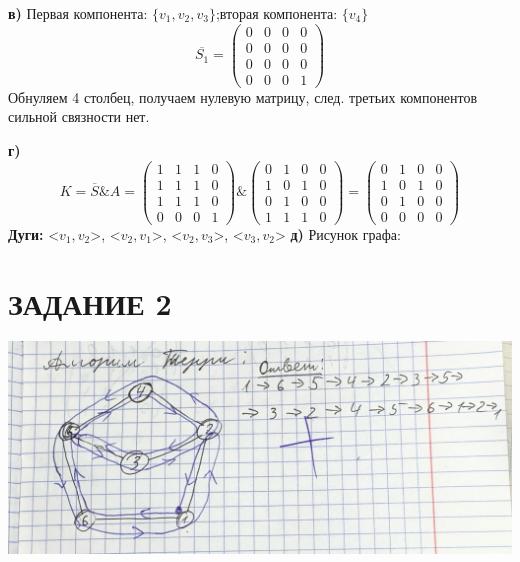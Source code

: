 \documentclass[14pt]{extarticle}
\begin{document}
\textbf{в)} Первая компонента: \(\{v_1,v_2,v_3\}\);вторая компонента: \(\{v_4\}\)
\[
\overline{S_1} = \begin{pmatrix}
0 & 0 & 0 & 0 \\
0 & 0 & 0 & 0 \\
0 & 0 & 0 & 0 \\
0 & 0 & 0 & 1
\end{pmatrix}
\]
Обнуляем 4 столбец, получаем нулевую матрицу, след. третьих компонентов сильной связности нет.

\textbf{г)} \[ K = \overline{S} \& A = 
\begin{pmatrix}
1 & 1 & 1 & 0 \\
1 & 1 & 1 & 0 \\
1 & 1 & 1 & 0 \\
0 & 0 & 0 & 1
\end{pmatrix}
\&
\begin{pmatrix}
0 & 1 & 0 & 0 \\
1 & 0 & 1 & 0 \\
0 & 1 & 0 & 0 \\
1 & 1 & 1 & 0
\end{pmatrix}
=
\begin{pmatrix}
0 & 1 & 0 & 0 \\
1 & 0 & 1 & 0 \\
0 & 1 & 0 & 0 \\
0 & 0 & 0 & 0
\end{pmatrix}
\]
\textbf{Дуги:} <\(v_1, v_2\)>, <\(v_2, v_1\)>, <\(v_2, v_3\)>, <\(v_3, v_2\)>
\newpage
\textbf{д)} Рисунок графа:\\
\begin{center}
\end{center}

\section*{\centering ЗАДАНИЕ 2}
\includegraphics[width=1\linewidth]{2.jpg}
\end{document}
